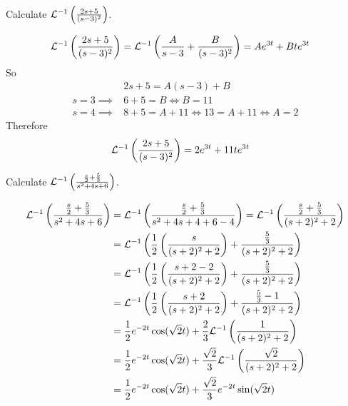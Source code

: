 \documentclass[notes]{subfiles}
\begin{document}
\begin{exercise} \label{useful_inv_laplace_transform}
    Calculate $\mathcal{L}^{-1} \left(\frac{2s + 5}{(s - 3)^2} \right)$.
\end{exercise}
\begin{solution}
    \begin{align*}
        \mathcal{L}^{-1} \left(\frac{2s + 5}{(s - 3)^2} \right)
        &= \mathcal{L}^{-1} \left( \frac{A}{s - 3} + \frac{B}{(s - 3)^2} \right)
        = Ae^{3t} + Bt e^{3t}
    \end{align*}
    So
    \begin{align*}
        &2s + 5 = A(s - 3) + B \\
        s = 3 \implies& 6 + 5 = B \iff B = 11 \\
        s = 4 \implies& 8 + 5 = A + 11 \iff 13 = A + 11 \iff A = 2
    \end{align*}
    Therefore
    \begin{align*}
        \mathcal{L}^{-1} \left(\frac{2s + 5}{(s - 3)^2} \right)
        &= 2e^{3t} + 11t e^{3t}
    \end{align*}
\end{solution}

\begin{exercise}
    Calculate $\mathcal{L}^{-1} \left( \frac{\frac{s}{2} + \frac{5}{3}}{s^2 + 4s + 6} \right)$.
\end{exercise}
\begin{solution}
    \begin{align*}
        \mathcal{L}^{-1} \left( \frac{\frac{s}{2} + \frac{5}{3}}{s^2 + 4s + 6} \right)
        &= \mathcal{L}^{-1} \left( \frac{\frac{s}{2} + \frac{5}{3}}{s^2 + 4s + 4 + 6 - 4} \right)
        = \mathcal{L}^{-1} \left( \frac{\frac{s}{2} + \frac{5}{3}}{(s + 2)^2 + 2} \right) \\
        &= \mathcal{L}^{-1} \left( \frac{1}{2}\left(\frac{s}{(s + 2)^2 + 2}\right) + \frac{\frac{5}{3}}{(s + 2)^2 + 2} \right) \\
        &= \mathcal{L}^{-1} \left( \frac{1}{2}\left(\frac{s + 2 - 2}{(s + 2)^2 + 2}\right) + \frac{\frac{5}{3}}{(s + 2)^2 + 2} \right) \\
        &= \mathcal{L}^{-1} \left( \frac{1}{2}\left(\frac{s + 2}{(s + 2)^2 + 2}\right) + \frac{\frac{5}{3} - 1}{(s + 2)^2 + 2} \right) \\
        &= \frac{1}{2}e^{-2t}\cos(\sqrt{2}t) + \frac{2}{3}\mathcal{L}^{-1} \left( \frac{1}{(s + 2)^2 + 2} \right) \\
        &= \frac{1}{2}e^{-2t}\cos(\sqrt{2}t) + \frac{\sqrt{2}}{3}\mathcal{L}^{-1} \left( \frac{\sqrt{2}}{(s + 2)^2 + 2} \right) \\
        &= \frac{1}{2}e^{-2t}\cos(\sqrt{2}t) + \frac{\sqrt{2}}{3}e^{-2t}\sin(\sqrt{2}t)
    \end{align*}
\end{solution}
\end{document}
